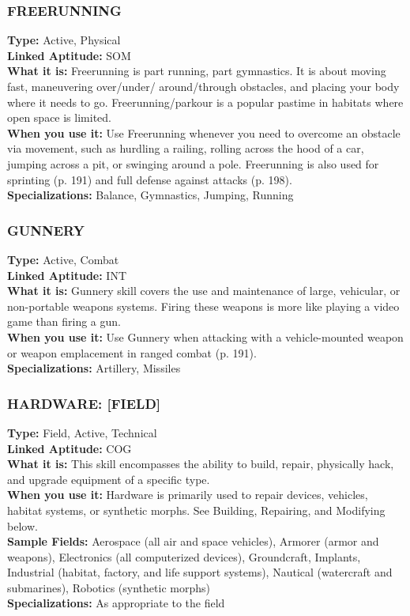 \subsubsection{FREERUNNING}
\textbf{Type:} Active, Physical
\\ \textbf{Linked Aptitude:} SOM
\\ \textbf{What it is:} Freerunning is part running, part gymnastics. It is about moving fast, maneuvering over/under/
around/through obstacles, and placing your body
where it needs to go. Freerunning/parkour is a popular
pastime in habitats where open space is limited.
\\ \textbf{When you use it:} Use Freerunning whenever you
need to overcome an obstacle via movement, such
as hurdling a railing, rolling across the hood of a
car, jumping across a pit, or swinging around a pole.
Freerunning is also used for sprinting (p. 191) and full
defense against attacks (p. 198).
\\ \textbf{Specializations:} Balance, Gymnastics, Jumping, Running

\subsubsection{GUNNERY}
\textbf{Type:} Active, Combat
\\ \textbf{Linked Aptitude:} INT
\\ \textbf{What it is:} Gunnery skill covers the use and maintenance of large, vehicular, or non-portable weapons
systems. Firing these weapons is more like playing a
video game than firing a gun.
\\ \textbf{When you use it:} Use Gunnery when attacking with
a vehicle-mounted weapon or weapon emplacement
in ranged combat (p. 191).
\\ \textbf{Specializations:} Artillery, Missiles

\subsubsection{HARDWARE: [FIELD]}
\textbf{Type:} Field, Active, Technical
\\ \textbf{Linked Aptitude:} COG
\\ \textbf{What it is:} This skill encompasses the ability to
build, repair, physically hack, and upgrade equipment
of a specific type.
\\ \textbf{When you use it:} Hardware is primarily used to repair
devices, vehicles, habitat systems, or synthetic morphs.
See Building, Repairing, and Modifying below.
\\ \textbf{Sample Fields:} Aerospace (all air and space vehicles),
Armorer (armor and weapons), Electronics (all
computerized devices), Groundcraft, Implants, Industrial (habitat, factory, and life support systems),
Nautical (watercraft and submarines), Robotics
(synthetic morphs)
\\ \textbf{Specializations:} As appropriate to the field


